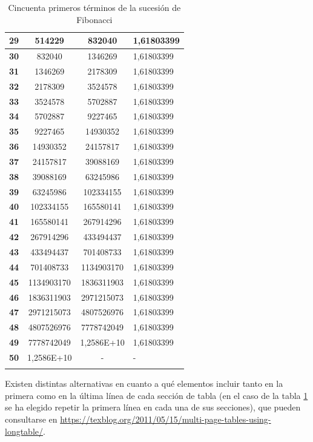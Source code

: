 \begin{longtable}[H]{|c|c|c|l|}
\textbf{29} & 514229 & 832040 & 1,61803399 \\ \hline
\textbf{30} & 832040 & 1346269 & 1,61803399 \\ \hline
\textbf{31} & 1346269 & 2178309 & 1,61803399 \\ \hline
\textbf{32} & 2178309 & 3524578 & 1,61803399 \\ \hline
\textbf{33} & 3524578 & 5702887 & 1,61803399 \\ \hline
\textbf{34} & 5702887 & 9227465 & 1,61803399 \\ \hline
\textbf{35} & 9227465 & 14930352 & 1,61803399 \\ \hline
\textbf{36} & 14930352 & 24157817 & 1,61803399 \\ \hline
\textbf{37} & 24157817 & 39088169 & 1,61803399 \\ \hline
\textbf{38} & 39088169 & 63245986 & 1,61803399 \\ \hline
\textbf{39} & 63245986 & 102334155 & 1,61803399 \\ \hline
\textbf{40} & 102334155 & 165580141 & 1,61803399 \\ \hline
\textbf{41} & 165580141 & 267914296 & 1,61803399 \\ \hline
\textbf{42} & 267914296 & 433494437 & 1,61803399 \\ \hline
\textbf{43} & 433494437 & 701408733 & 1,61803399 \\ \hline
\textbf{44} & 701408733 & 1134903170 & 1,61803399 \\ \hline
\textbf{45} & 1134903170 & 1836311903 & 1,61803399 \\ \hline
\textbf{46} & 1836311903 & 2971215073 & 1,61803399 \\ \hline
\textbf{47} & 2971215073 & 4807526976 & 1,61803399 \\ \hline
\textbf{48} & 4807526976 & 7778742049 & 1,61803399 \\ \hline
\textbf{49} & 7778742049 & 1,2586E+10 & 1,61803399 \\ \hline
\textbf{50} & 1,2586E+10 & - & - \\ \hline
\caption{Cincuenta primeros términos de la sucesión de Fibonacci}
\label{tabla:fibonacci50}
\end{longtable}

Existen distintas alternativas en cuanto a qué elementos incluir tanto en la primera como en la última línea de cada sección de tabla (en el caso de la tabla \ref{tabla:fibonacci50} se ha elegido repetir la primera línea en cada una de sus secciones), que pueden consultarse en \url{https://texblog.org/2011/05/15/multi-page-tables-using-longtable/}.


